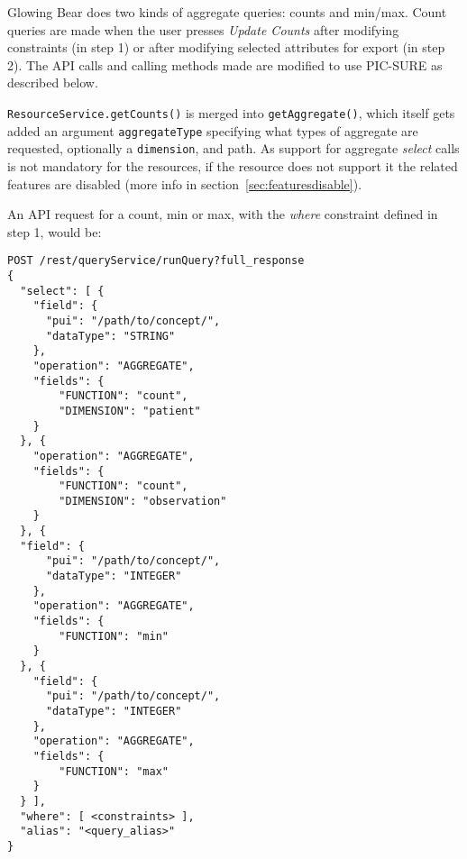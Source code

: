 Glowing Bear does two kinds of aggregate queries: counts and min/max.
Count queries are made when the user presses \emph{Update Counts} after modifying constraints (in step 1) or after modifying selected attributes for export (in step 2).
The API calls and calling methods made are modified to use PIC-SURE as described below.

\verb|ResourceService.getCounts()| is merged into \verb|getAggregate()|, which itself gets added an argument \verb|aggregateType| specifying what types of aggregate are requested, optionally a \verb|dimension|, and path. %
As support for aggregate \emph{select} calls is not mandatory for the resources, if the resource does not support it the related features are disabled (more info in section~\ref{sec:featuresdisable}).

An API request for a count, min or max, with the \emph{where} constraint defined in step 1, would be:
\begin{verbatim}
POST /rest/queryService/runQuery?full_response
{
  "select": [ {
    "field": {
      "pui": "/path/to/concept/",
      "dataType": "STRING"
    },
    "operation": "AGGREGATE",
    "fields": {
        "FUNCTION": "count",
        "DIMENSION": "patient"
    }
  }, {
    "operation": "AGGREGATE",
    "fields": {
        "FUNCTION": "count",
        "DIMENSION": "observation"
    }
  }, {
  "field": {
      "pui": "/path/to/concept/",
      "dataType": "INTEGER"
    },
    "operation": "AGGREGATE",
    "fields": {
        "FUNCTION": "min"
    }
  }, {
    "field": {
      "pui": "/path/to/concept/",
      "dataType": "INTEGER"
    },
    "operation": "AGGREGATE",
    "fields": {
        "FUNCTION": "max"
    }
  } ],
  "where": [ <constraints> ],
  "alias": "<query_alias>"
}
\end{verbatim}


